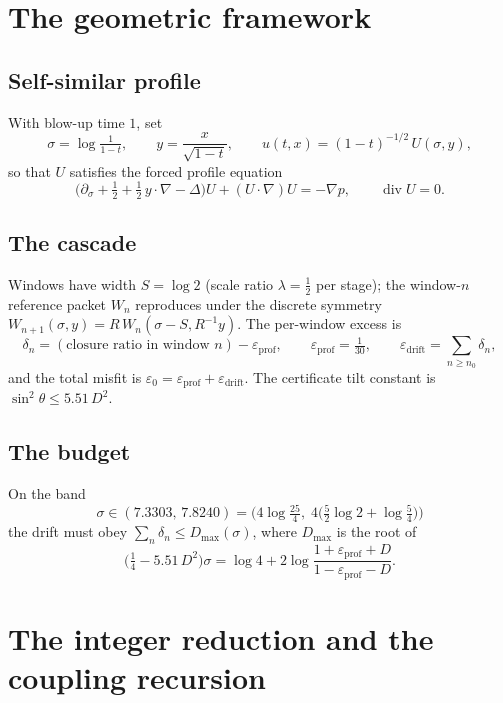 \documentclass[11pt]{article}
\begin{document}
\section{The geometric framework}\label{sec:framework}

\subsection{Self-similar profile}
With blow-up time $1$, set
\[
\sigma=\log\tfrac{1}{1-t},\qquad
y=\frac{x}{\sqrt{1-t}},\qquad
u(t,x)=(1-t)^{-1/2}\,U(\sigma,y),
\]
so that $U$ satisfies the forced profile equation
\[
\bigl(\partial_\sigma+\tfrac12+\tfrac12\,y\cdot\nabla-\Delta\bigr)U+(U\cdot\nabla)U
= -\nabla p,\qquad \operatorname{div}U=0 .
\]

\subsection{The cascade}
Windows have width $S=\log 2$ (scale ratio $\lambda=\tfrac12$ per stage); the window-$n$
reference packet $W_n$ reproduces under the discrete symmetry
$W_{n+1}(\sigma,y)=R\,W_n(\sigma-S,R^{-1}y)$. The per-window excess is
\[
\delta_n=(\text{closure ratio in window } n)-\varepsilon_{\mathrm{prof}},
\qquad \varepsilon_{\mathrm{prof}}=\tfrac1{30},
\qquad \varepsilon_{\mathrm{drift}}=\sum_{n\ge n_0}\delta_n,
\]
and the total misfit is $\varepsilon_0=\varepsilon_{\mathrm{prof}}+\varepsilon_{\mathrm{drift}}$.
The certificate tilt constant is $\sin^2\theta\le 5.51\,D^2$.

\subsection{The budget}
On the band
\[
\sigma\in(7.3303,\,7.8240)
=\bigl(4\log\tfrac{25}{4},\;4\bigl(\tfrac52\log 2+\log\tfrac54\bigr)\bigr)
\]
the drift must obey $\sum_n\delta_n\le D_{\max}(\sigma)$, where $D_{\max}$ is the root of
\[
\bigl(\tfrac14-5.51\,D^2\bigr)\sigma
=\log 4+2\log\frac{1+\varepsilon_{\mathrm{prof}}+D}{1-\varepsilon_{\mathrm{prof}}-D}.
\]

\section{The integer reduction and the coupling recursion}\label{sec:reduction}
\end{document}
